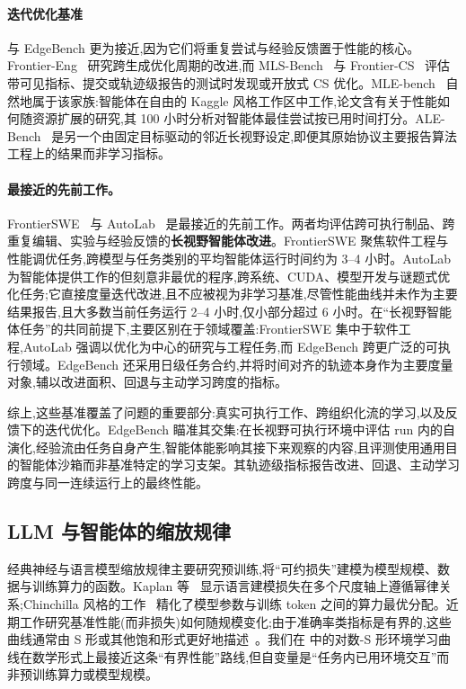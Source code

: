 \paragraph{迭代优化基准}与 EdgeBench 更为接近,因为它们将重复尝试与经验反馈置于性能的核心。Frontier-Eng~\cite{chi2026frontiereng} 研究跨生成优化周期的改进,而 MLS-Bench~\cite{lyu2026mlsbench} 与 Frontier-CS~\cite{mang2025frontiercs} 评估带可见指标、提交或轨迹级报告的测试时发现或开放式 CS 优化。MLE-bench~\cite{chan2025mle} 自然地属于该家族:智能体在自由的 Kaggle 风格工作区中工作,论文含有关于性能如何随资源扩展的研究,其 100 小时分析对智能体最佳尝试按已用时间打分。ALE-Bench~\cite{imajuku2025alebench} 是另一个由固定目标驱动的邻近长视野设定,即便其原始协议主要报告算法工程上的结果而非学习指标。

\paragraph{最接近的先前工作。} FrontierSWE~\cite{chu2026frontierswe} 与 AutoLab~\cite{xu2026autolab} 是最接近的先前工作。两者均评估跨可执行制品、跨重复编辑、实验与经验反馈的\textbf{长视野智能体改进}。FrontierSWE 聚焦软件工程与性能调优任务,跨模型与任务类别的平均智能体运行时间约为 3--4 小时。AutoLab 为智能体提供工作的但刻意非最优的程序,跨系统、CUDA、模型开发与谜题式优化任务;它直接度量迭代改进,且不应被视为非学习基准,尽管性能曲线并未作为主要结果报告,且大多数当前任务运行 2--4 小时,仅小部分超过 6 小时。在``长视野智能体任务''的共同前提下,主要区别在于领域覆盖:FrontierSWE 集中于软件工程,AutoLab 强调以优化为中心的研究与工程任务,而 EdgeBench 跨更广泛的可执行领域。EdgeBench 还采用日级任务合约,并将时间对齐的轨迹本身作为主要度量对象,辅以改进面积、回退与主动学习跨度的指标。

综上,这些基准覆盖了问题的重要部分:真实可执行工作、跨组织化流的学习,以及反馈下的迭代优化。EdgeBench 瞄准其交集:在长视野可执行环境中评估 run 内的自演化,经验流由任务自身产生,智能体能影响其接下来观察的内容,且评测使用通用目的智能体沙箱而非基准特定的学习支架。其轨迹级指标报告改进、回退、主动学习跨度与同一连续运行上的最终性能。

\subsection{LLM 与智能体的缩放规律}
\label{app:related-scaling}

经典神经与语言模型缩放规律主要研究预训练,将``可约损失''建模为模型规模、数据与训练算力的函数。Kaplan 等~\cite{kaplan2020} 显示语言建模损失在多个尺度轴上遵循幂律关系;Chinchilla 风格的工作~\cite{hoffmann2022} 精化了模型参数与训练 token 之间的算力最优分配。近期工作研究基准性能(而非损失)如何随规模变化;由于准确率类指标是有界的,这些曲线通常由 S 形或其他饱和形式更好地描述~\cite{bhagia2024ladder,owen2024predictable,ruan2024observational,zhang2026prescriptive}。我们在  中的对数-S 形环境学习曲线在数学形式上最接近这条``有界性能''路线,但自变量是``任务内已用环境交互''而非预训练算力或模型规模。

